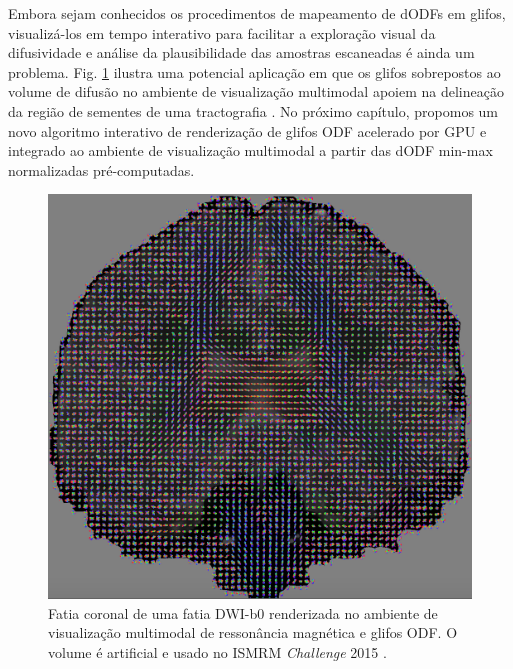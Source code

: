 \documentclass[
    12pt,                %
    oneside,            %
    a4paper,            %
    english,            %
    french,                %
    spanish,            %
    brazil                %
    ]{abntex2}
\begin{document}
Embora sejam conhecidos os procedimentos de mapeamento de dODFs em glifos, visualizá-los em tempo interativo para facilitar a exploração visual da difusividade e análise da plausibilidade das amostras escaneadas é ainda um problema. Fig. \ref{fig::QBall_glifos_coronal} ilustra uma potencial aplicação em que os glifos sobrepostos ao volume de difusão no ambiente de visualização multimodal apoiem na delineação da região de sementes de uma tractografia \cite{voltoline2021}.
No próximo capítulo, propomos um novo algoritmo interativo de renderização de glifos ODF acelerado por GPU e integrado ao ambiente de visualização multimodal a partir das dODF min-max normalizadas pré-computadas.

 \begin{figure}[H]
     \centering
     \includegraphics[width=0.7\linewidth, angle=0]{figs/Exemplos_QBall_visualizacao/Coronal.png}
     \caption{Fatia coronal de uma fatia DWI-b0 renderizada no ambiente de visualização multimodal de ressonância magnética e glifos ODF. O volume é artificial e usado no ISMRM \textit{Challenge} 2015 \cite{TractometerTool}.}
      \label{fig::QBall_glifos_coronal}
 \end{figure}



\end{document}
